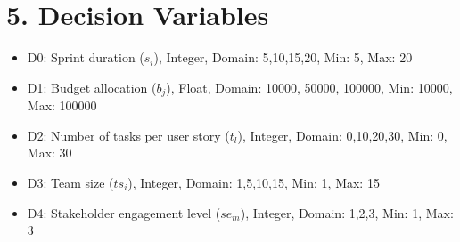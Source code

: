 \documentclass{article}
\begin{document}
\section{5. Decision Variables}
\begin{itemize}
    \item D0: Sprint duration (\( s_i \)), Integer, Domain: {5,10,15,20}, Min: 5, Max: 20
    \item D1: Budget allocation (\( b_j \)), Float, Domain: {10000, 50000, 100000}, Min: 10000, Max: 100000
    \item D2: Number of tasks per user story (\( t_l \)), Integer, Domain: {0,10,20,30}, Min: 0, Max: 30
    \item D3: Team size (\( ts_i \)), Integer, Domain: {1,5,10,15}, Min: 1, Max: 15
    \item D4: Stakeholder engagement level (\( se_m \)), Integer, Domain: {1,2,3}, Min: 1, Max: 3
\end{itemize}
\end{document}

